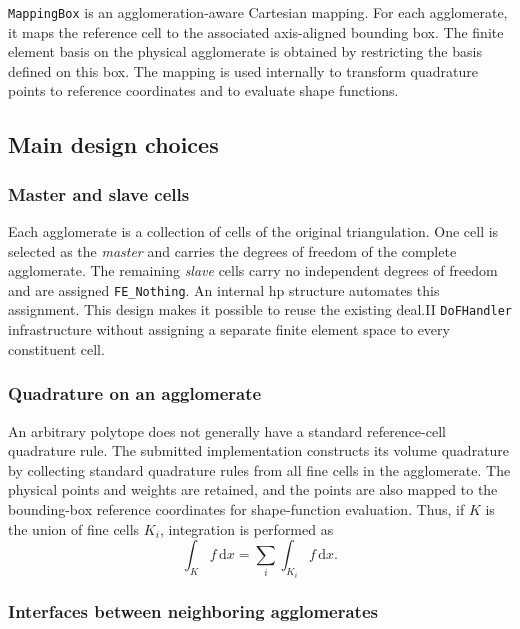 \documentclass[a4paper,12pt]{article}
\begin{document}
\texttt{MappingBox} is an agglomeration-aware Cartesian mapping. For each agglomerate, it maps the reference cell to the associated axis-aligned bounding box. The finite element basis on the physical agglomerate is obtained by restricting the basis defined on this box. The mapping is used internally to transform quadrature points to reference coordinates and to evaluate shape functions.

\subsection{{Main design choices}}

\subsubsection{Master and slave cells}

Each agglomerate is a collection of cells of the original triangulation. One
cell is selected as the \emph{master} and carries the degrees of freedom of
the complete agglomerate. The remaining \emph{slave} cells carry no
independent degrees of freedom and are assigned \texttt{FE\_Nothing}. An
internal hp structure automates this assignment. This design makes it
possible to reuse the existing deal.II \texttt{DoFHandler} infrastructure
without assigning a separate finite element space to every constituent cell.

\subsubsection{Quadrature on an agglomerate}

An arbitrary polytope does not generally have a standard reference-cell
quadrature rule. The submitted implementation constructs its volume
quadrature by collecting standard quadrature rules from all fine cells in the
agglomerate. The physical points and weights are retained, and the points are
also mapped to the bounding-box reference coordinates for shape-function
evaluation. Thus, if $K$ is the union of fine cells $K_i$, integration is
performed as
\begin{equation}
    \int_K f\,\mathrm{d}x = \sum_i \int_{K_i} f\,\mathrm{d}x.
\end{equation}

\subsubsection{Interfaces between neighboring agglomerates}
\end{document}
